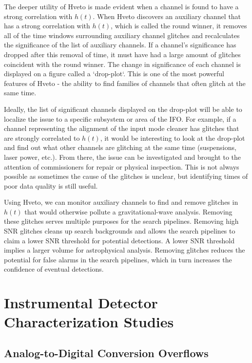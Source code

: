 The deeper utility of Hveto is made evident when a channel is found to have 
a strong correlation with $h(t)$. 
When Hveto discovers an auxiliary channel that has a strong correlation 
with $h(t)$, which is called the round winner, it removes all of the time 
windows surrounding 
auxiliary channel glitches and recalculates the significance of the list of 
auxiliary channels. If a channel's significance has dropped after this removal 
of time, it must have had a large amount of glitches coincident with the 
round winner. The change in significance of each channel is displayed on a 
figure called a `drop-plot`. This is one of the most powerful features of Hveto
 - the ability to find families of channels that often glitch at the same time. 

Ideally, the list of significant channels displayed on the drop-plot will be 
able to localize the issue to a specific subsystem or area of the IFO. 
For example, if a channel representing the alignment of the input mode 
cleaner has glitches that are strongly correlated to $h(t)$, it would be 
interesting to look at the drop-plot and find out what other channels are 
glitching at the same time (suspensions, laser power, etc.).
From there, the issue can be investigated and brought to the attention of 
commissioners for repair or physical inspection. This is not always possible 
as sometimes the cause of the glitches is unclear, but identifying times of 
poor data quality is still useful.

Using Hveto, we can monitor auxiliary channels to find and remove glitches 
in $h(t)$ that would otherwise pollute a gravitational-wave analysis. Removing 
these glitches serves multiple purposes for the search pipelines. Removing 
high SNR glitches cleans up search backgrounds and allows the search 
pipelines to claim a lower SNR threshold for potential detections. A lower 
SNR threshold implies a larger volume for astrophysical analysis. Removing 
glitches reduces the potential for false alarms in the search pipelines, 
which in turn increases the confidence of eventual detections.

\section{Instrumental Detector Characterization Studies}

\subsection{Analog-to-Digital Conversion Overflows}

